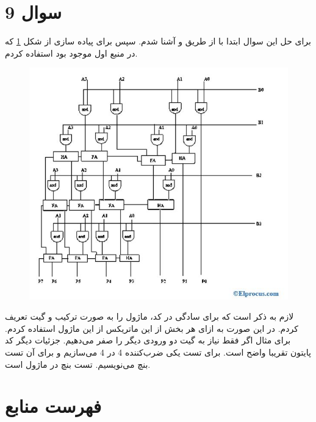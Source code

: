\documentclass{article}
\begin{document}
\section{سوال 9}
برای حل این سوال ابتدا با 
از طریق 
\cite{array-multiplier-elprocus} 
و 
\cite{array-multiplier-youtube} 
آشنا شدم. سپس برای پیاده سازی از شکل 
\ref{elprocus-pic}
که در منبع اول موجود بود استفاده کردم. 
\begin{figure}[!htbp]
	\centering
	\includegraphics[width=\linewidth]{logic-diagram-of-4-by-4-array-multiplier.jpg}
	\caption{}
	\label{elprocus-pic}
\end{figure}
لازم به ذکر است که برای سادگی در کد، ماژول 
را به صورت ترکیب 
و گیت 
تعریف کردم. در این صورت به ازای هر بخش از این ماتریکس از این 
ماژول استفاده کردم. برای مثال اگر فقط نیاز به گیت 
دو ورودی دیگر را صفر می‌دهیم. جزئیات دیگر کد پایتون تقریبا واضح است. 
برای تست یکی ضرب‌کننده 4 در 4 می‌سازیم و برای آن تست بنچ می‌نویسیم. تست بنچ در ماژول 
است.

\newpage
\section*{فهرست منابع}
\begin{latin}
    \printbibliography[heading=bibintoc, title=فهرست منابع]
\end{latin}
\end{document}
